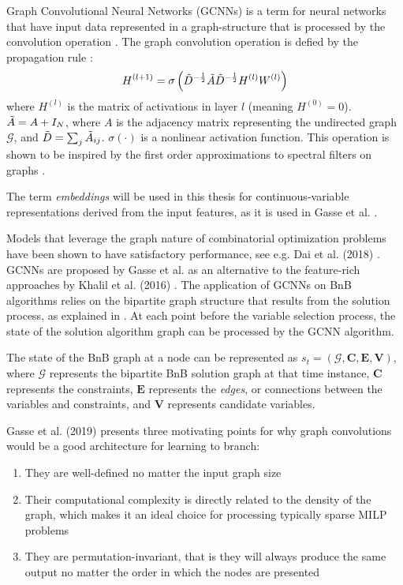 Graph Convolutional Neural Networks (\gls{GCNN}s) is a term for neural networks that have input data represented in a graph-structure that is processed by the convolution operation \cite{kipf2016semisupervised}. The graph convolution operation is defied by the propagation rule \cite{kipf2016semisupervised}:
\begin{equation}
    H^{(l+1)} = \sigma \left( \Tilde{D}^{-\frac{1}{2}} \Tilde{A} \Tilde{D}^{-\frac{1}{2}} H^{(l)}W^{(l)}\right)
\end{equation}
where $H^{(l)}$ is the matrix of activations in layer $l$ (meaning $H^{(0)} = 0$). $\Tilde{A} = A + I_N$, where $A$ is the adjacency matrix representing the undirected graph $\mathcal{G}$, and $\Tilde{D} = \sum_j \Tilde{A}_{i j}$. $\sigma( \cdot) $ is a nonlinear activation function.
This operation is shown to be inspired by the first order approximations to spectral filters on graphs \cite{kipf2016semisupervised}.

The term \textit{embeddings} will be used in this thesis for continuous-variable representations derived from the input features, as it is used in Gasse et al. \cite{gasse2019exact}. 

Models that leverage the graph nature of combinatorial optimization problems have been shown to have satisfactory performance, see e.g. Dai et al. (2018) \cite{dai2018learning}. 
\gls{GCNN}s are proposed by Gasse et al. \cite{gasse2019exact} as an alternative to the feature-rich approaches by Khalil et al. (2016) \cite{khalil2016learning}. 
The application of \gls{GCNN}s on \gls{BnB} algorithms relies on the bipartite graph structure that results from the solution process, as explained in . At each point before the variable selection process, the state of the solution algorithm graph can be processed by the \gls{GCNN} algorithm. 

The state of the \gls{BnB} graph at a node can be represented as $s_t = (\mathcal{G}, \mathbf{C}, \mathbf{E}, \mathbf{V})$, where $\mathcal{G}$ represents the bipartite \gls{BnB} solution graph at that time instance, $\mathbf{C}$ represents the constraints, $\mathbf{E}$ represents the \textit{edges}, or connections between the variables and constraints, and $\mathbf{V}$ represents candidate variables.  

Gasse et al. (2019) \cite{gasse2019exact} presents three motivating points for why graph convolutions would be a good architecture for learning to branch:
\begin{enumerate}[label=(\roman*)]
    \item They are well-defined no matter the input graph size
    \item Their computational complexity is directly related
to the density of the graph, which makes it an ideal choice for processing typically sparse MILP
problems
    \item They are permutation-invariant, that is they will always produce the same output no
matter the order in which the nodes are presented
\end{enumerate}




